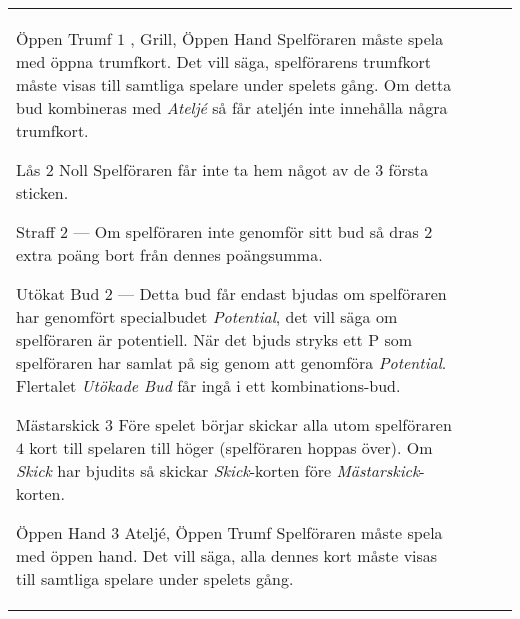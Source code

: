 \begin{table}
\begin{center}
\begin{tabularx}{\textwidth}{lcp{3cm}|X}
			\specialBidItem%
			{Öppen Trumf}
			{$1$}
			{\nonTrump, Grill, Öppen Hand}
			{%
				Spelföraren måste spela med öppna trumfkort. Det vill säga, spelförarens trumfkort måste visas till samtliga spelare under spelets gång. Om detta bud kombineras med \emph{Ateljé} så får ateljén inte innehålla några trumfkort.
			}

			\specialBidItem%
			{Lås}
			{$2$}
			{Noll}
			{%
				Spelföraren får inte ta hem något av de $3$ första sticken.
			}

			\specialBidItem%
			{Straff}
			{$2$}
			{---}
			{%
				Om spelföraren inte genomför sitt bud så dras $2$ extra poäng bort från dennes poängsumma.
			}

			\specialBidItem%
			{Utökat Bud}
			{$2$}
			{---}
			{%
				Detta bud får endast bjudas om spelföraren har genomfört specialbudet \emph{Potential}, det vill säga om spelföraren är potentiell. När det bjuds stryks ett P som spelföraren har samlat på sig genom att genomföra \emph{Potential}. Flertalet \emph{Utökade Bud} får ingå i ett kombinations-bud.
			}

			\specialBidItem%
			{Mästarskick}
			{$3$}
			{\nonTrump}
			{%
				Före spelet börjar skickar alla utom spelföraren $4$ kort till spelaren till höger (spelföraren hoppas över). Om \emph{Skick} har bjudits så skickar \emph{Skick}-korten före \emph{Mästarskick}-korten.
			}

			\specialBidItem%
			{Öppen Hand}
			{$3$}
			{Ateljé, Öppen Trumf}
			{%
				Spelföraren måste spela med öppen hand. Det vill säga, alla dennes kort måste visas till samtliga spelare under spelets gång.
			}
		\end{tabularx}
	\end{center}
\end{table}
